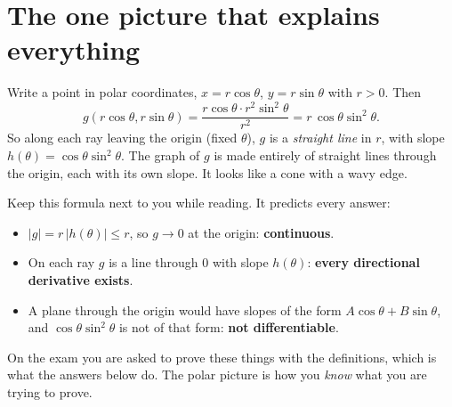 \section{The one picture that explains everything}

Write a point in polar coordinates, $x=r\cos\theta$, $y=r\sin\theta$ with $r>0$. Then
\[
  g(r\cos\theta,r\sin\theta)=\frac{r\cos\theta\cdot r^2\sin^2\theta}{r^2}=r\,\cos\theta\sin^2\theta .
\]
So along each ray leaving the origin (fixed $\theta$), $g$ is a \emph{straight line} in $r$, with slope
$h(\theta)=\cos\theta\sin^2\theta$. The graph of $g$ is made entirely of straight lines through the
origin, each with its own slope. It looks like a cone with a wavy edge.

\begin{center}
\end{center}

Keep this formula next to you while reading. It predicts every answer:
\begin{itemize}
  \item $|g|=r\,|h(\theta)|\le r$, so $g\to0$ at the origin: \textbf{continuous}.
  \item On each ray $g$ is a line through $0$ with slope $h(\theta)$: \textbf{every directional derivative exists}.
  \item A plane through the origin would have slopes of the form $A\cos\theta+B\sin\theta$, and
        $\cos\theta\sin^2\theta$ is not of that form: \textbf{not differentiable}.
\end{itemize}
On the exam you are asked to prove these things with the definitions, which is what the answers below
do. The polar picture is how you \emph{know} what you are trying to prove.

